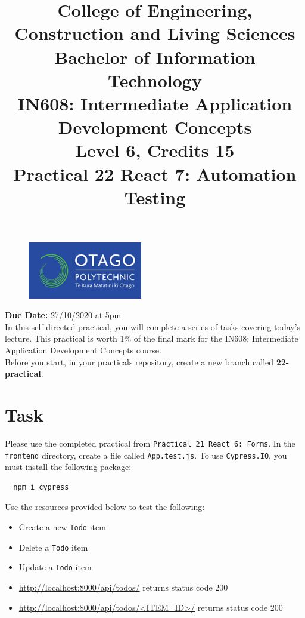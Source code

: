\documentclass{article}
\author{}
\begin{document}
\begin{figure}
	\centering
	\includegraphics[width=50mm]{img/logo.png}
\end{figure}

\title{College of Engineering, Construction and Living Sciences\\Bachelor of Information Technology\\IN608: Intermediate Application Development Concepts\\Level 6, Credits 15\\\textbf{Practical 22 React 7: Automation Testing}} 
\date{}
\maketitle

\textbf{Due Date:} 27/10/2020 at 5pm \\

In this self-directed practical, you will complete a series of tasks covering today's lecture. This practical is worth 1\% of the final mark for the IN608: Intermediate Application Development Concepts course. \\

Before you start, in your practicals repository, create a new branch called \textbf{22-practical}. 

\section*{Task} 
Please use the completed practical from \texttt{Practical 21 React 6: Forms}. In the \texttt{frontend} directory, create a file called \texttt{App.test.js}. To use \texttt{Cypress.IO}, you must install the following package:

\begin{verbatim}
  npm i cypress
\end{verbatim}

Use the resources provided below to test the following:
\begin{itemize}
  \item Create a new \texttt{Todo} item
  \item Delete a \texttt{Todo} item
  \item Update a \texttt{Todo} item
  \item \href{http://localhost:8000/api/todos/}{http://localhost:8000/api/todos/} returns status code 200
  \item \href{http://localhost:8000/api/todos/<ITEM\_ID>/}{http://localhost:8000/api/todos/<ITEM\_ID>/} returns status code 200
\end{itemize}
\end{document}
